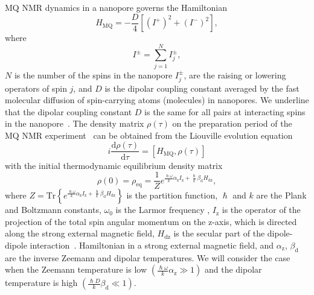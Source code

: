 \documentclass[review]{elsarticle}
\begin{document}
MQ NMR dynamics in a nanopore governs the Hamiltonian~\cite{Doronin_2019,Doronin_2009} 
%
\begin{equation}
    \label{eq:1}
    H_{\mathrm{MQ}} = - \dfrac{D}{4} \left[
        \left(I^{+}\right)^{2} 
        + \left(I^{-}\right)^{2} 
    \right] ,
\end{equation}
%
where 
%
\begin{equation}
    \label{eq:2}
    I^{\pm} = \sum\limits_{j=1}^{N} I_{j}^{\pm},
\end{equation}
%
$N$ is the number of the spins in the nanopore $I^{\pm}_{j}$, are the raising or lowering operators of spin $j$, and $D$ is the dipolar coupling constant averaged by the fast molecular diffusion of spin-carrying atoms (molecules) in nanopores.
We underline that the dipolar coupling constant $D$ is the same for all pairs at interacting spins in the nanopore~\cite{Doronin_2019,Doronin_2009}.
The density matrix $\rho(\tau)$ on the preparation period of the MQ NMR experiment~\cite{Baum_1985} can be obtained from the Liouville evolution equation~\cite{Andrew_1971,Abragam_1982} 
%
\begin{equation}
    \label{eq:3}
    i\dfrac{\mathrm{d}\rho(\tau)}{\mathrm{d}\tau} = \left[
    H_\mathrm{MQ},\rho(\tau)
    \right]
\end{equation}
%
with the initial thermodynamic equilibrium density matrix 
%
\begin{equation}
    \label{eq:4}
       \rho(0) = \rho_\mathrm{eq} = \dfrac{1}{Z}
       e^{
            \frac{\hslash \omega}{k} \alpha_\mathrm{z} I_\mathrm{z} 
            + \frac{\hslash }{k} \beta_\mathrm{d} H_\mathrm{dz}
        },
\end{equation}
%
where 
$Z = \mathrm{Tr} \left\{ e^{\frac{\hslash \omega}{k} \alpha_\mathrm{z} I_\mathrm{z} + \frac{\hslash  }{k} \beta_\mathrm{d} H_\mathrm{dz}} \right\}$ is the partition function, 
$\hslash$ and $k$ are the Plank and Boltzmann constants, 
$\omega_{0}$  is the Larmor frequency , $I_\mathrm{z}$ is the operator of the projection of the total spin angular momentum on the z-axis, 
which is directed along the strong external magnetic field,  
$H_\mathrm{dz}$ is the secular part of the dipole-dipole interaction~\cite{?}.
Hamiltonian in a strong external magnetic field, and $\alpha_\mathrm{z}$, $\beta_\mathrm{d}$ are the inverse Zeemann and dipolar temperatures. 
We will consider the case when the Zeemann temperature is low $({\frac{\hslash \omega}{k} \alpha_\mathrm{z}}\gg 1)$ 
and the dipolar temperature is high $\left( \frac{\hslash{D}}{k}\beta_\mathrm{d} \ll 1\right)$.
\end{document}
